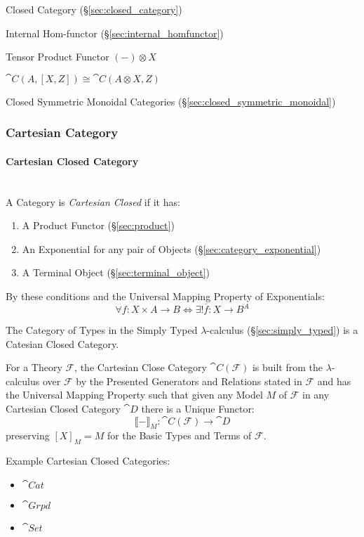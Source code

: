 Closed Category (\S\ref{sec:closed_category})

Internal Hom-functor (\S\ref{sec:internal_homfunctor})

Tensor Product Functor $(-) \otimes X$

$\cat{C}(A, [X,Z]) \cong \cat{C}(A \otimes X, Z)$

Closed Symmetric Monoidal Categories
(\S\ref{sec:closed_symmetric_monoidal})



\subsubsection{Cartesian Category}\label{sec:cartesian_category}

\paragraph{Cartesian Closed Category}\label{sec:cartesian_closed}
\hfill \\

A Category is \emph{Cartesian Closed} if it has:
\begin{enumerate}
\item A Product Functor (\S\ref{sec:product})
\item An Exponential for any pair of Objects
  (\S\ref{sec:category_exponential})
\item A Terminal Object (\S\ref{sec:terminal_object})
\end{enumerate}
By these conditions and the Universal Mapping Property of
Exponentials:
\[
  \forall f : X \times A \rightarrow B \Leftrightarrow
  \exists ! \overline{f} : X \rightarrow B^A
\]

The Category of Types in the Simply Typed $\lambda$-calculus
(\S\ref{sec:simply_typed}) is a Catesian Closed Category.

For a Theory $\mathcal{F}$, the Cartesian Close Category
$\cat{C}(\mathcal{F})$ is built from the $\lambda$-calculus over
$\mathcal{F}$ by the Presented Generators and Relations stated in
$\mathcal{F}$ and has the Universal Mapping Property such that given
any Model $M$ of $\mathcal{F}$ in any Cartesian Closed Category
$\cat{D}$ there is a Unique Functor:
\[
  \llbracket - \rrbracket_M :
    \cat{C}(\mathcal{F}) \rightarrow \cat{D}
\]
preserving $[X]_M = M$ for the Basic Types and Terms of $\mathcal{F}$.
\cite{awodey06}

Example Cartesian Closed Categories:

\begin{itemize}
\item $\cat{Cat}$
\item $\cat{Grpd}$
\item $\cat{Set}$
\end{itemize}

